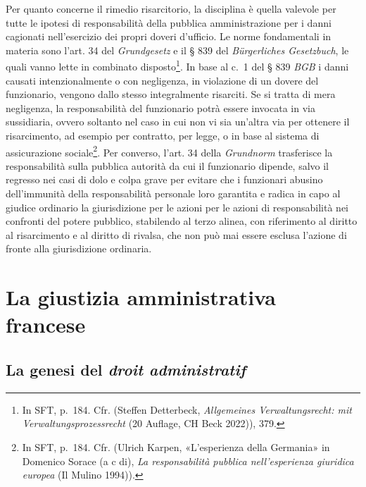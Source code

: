 \documentclass[12pt,it,a4paper,]{report}
\begin{document}
Per quanto concerne il rimedio risarcitorio, la disciplina è quella
valevole per tutte le ipotesi di responsabilità della pubblica
amministrazione per i danni cagionati nell'esercizio dei propri doveri
d'ufficio. Le norme fondamentali in materia sono l'art. 34 del
\emph{Grundgesetz} e il § 839 del \emph{Bürgerliches Gesetzbuch}, le
quali vanno lette in combinato disposto\footnote{In SFT, p.~184. Cfr.
  (Steffen Detterbeck, \emph{Allgemeines Verwaltungsrecht: mit
  Verwaltungsprozessrecht} (20 Auflage, CH Beck 2022)), 379.}. In base
al c.~1 del § 839 \emph{BGB} i danni causati intenzionalmente o con
negligenza, in violazione di un dovere del funzionario, vengono dallo
stesso integralmente risarciti. Se si tratta di mera negligenza, la
responsabilità del funzionario potrà essere invocata in via sussidiaria,
ovvero soltanto nel caso in cui non vi sia un'altra via per ottenere il
risarcimento, ad esempio per contratto, per legge, o in base al sistema
di assicurazione sociale\footnote{In SFT, p.~184. Cfr. (Ulrich Karpen,
  {«L'esperienza della Germania»} in Domenico Sorace (a c di), \emph{La
  responsabilità pubblica nell'esperienza giuridica europea} (Il Mulino
  1994)).}. Per converso, l'art. 34 della \emph{Grundnorm} trasferisce
la responsabilità sulla pubblica autorità da cui il funzionario dipende,
salvo il regresso nei casi di dolo e colpa grave per evitare che i
funzionari abusino dell'immunità della responsabilità personale loro
garantita e radica in capo al giudice ordinario la giurisdizione per le
azioni per le azioni di responsabilità nei confronti del potere
pubblico, stabilendo al terzo alinea, con riferimento al diritto al
risarcimento e al diritto di rivalsa, che non può mai essere esclusa
l'azione di fronte alla giurisdizione ordinaria.

\hypertarget{la-giustizia-amministrativa-francese}{%
\chapter{La giustizia amministrativa
francese}\label{la-giustizia-amministrativa-francese}}

\hypertarget{la-genesi-del-droit-administratif}{%
\section{\texorpdfstring{La genesi del \emph{droit
administratif}}{La genesi del droit administratif}}\label{la-genesi-del-droit-administratif}}
\end{document}
